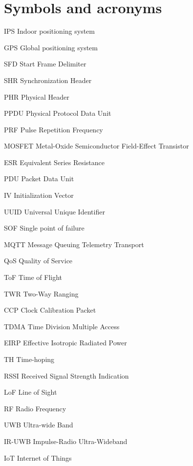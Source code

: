 \documentclass[\main/thesis.tex]{subfiles}
\begin{document}
\chapter*{Symbols and acronyms}
\begin{abbrv}
    \item[IPS]  Indoor positioning system
    \item[GPS]  Global positioning system 
    \item[SFD]  Start Frame Delimiter
    \item[SHR]  Synchronization Header
    \item[PHR]  Physical Header
    \item[PPDU] Physical Protocol Data Unit
    \item[PRF]  Pulse Repetition Frequency
    \item[MOSFET]  Metal-Oxide Semiconductor Field-Effect Transistor
    \item[ESR]  Equivalent Series Resistance
    \item[PDU] Packet Data Unit
    \item[IV] Initialization Vector
    \item[UUID] Universal Unique Identifier 
    \item[SOF] Single point of failure  
    \item[MQTT] Message Queuing Telemetry Transport 
    \item[QoS] Quality of Service
    \item[ToF] Time of Flight
    \item[TWR] Two-Way Ranging
    \item[CCP] Clock Calibration Packet  
    \item[TDMA] Time Division Multiple Access 
    \item[EIRP] Effective Isotropic Radiated Power
    \item[TH] Time-hoping 
    \item[RSSI] Received Signal Strength Indication
    \item[LoF] Line of Sight
    \item[RF] Radio Frequency 
    \item[UWB] Ultra-wide Band 
    \item[IR-UWB] Impulse-Radio Ultra-Wideband 
    \item[IoT] Internet of Things
\end{abbrv}
\end{document}

